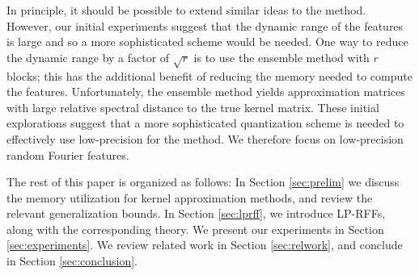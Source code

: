 In principle, it should be possible to extend similar ideas to the \Nystrom method. However, our initial experiments suggest that the dynamic range of the \Nystrom features is large and so a more sophisticated scheme would be needed. One way to reduce the dynamic range by a factor of $\sqrt{r}$ is to use the ensemble \Nystrom method \citep{ensemble09} with $r$ blocks; this has the additional benefit of reducing the memory needed to compute the features. Unfortunately, the ensemble method yields approximation matrices with large relative spectral distance to the true kernel matrix. These initial explorations suggest that a more sophisticated quantization scheme is needed to effectively use low-precision for the \Nystrom method. We therefore focus on low-precision random Fourier features.



The rest of this paper is organized as follows: In Section \ref{sec:prelim} we discuss the memory utilization for kernel approximation methods, and review the relevant generalization bounds.  In Section \ref{sec:lprff}, we introduce LP-RFFs, along with the corresponding theory. We present our experiments in Section \ref{sec:experiments}.  We review related work in Section \ref{sec:relwork}, and conclude in Section \ref{sec:conclusion}.
